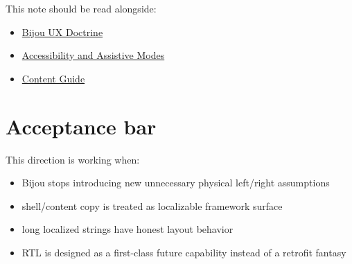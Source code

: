 This note should be read alongside:

\begin{itemize}
\tightlist
\item
  \href{https://github.com/flyingrobots/bijou/blob/cbd70612140e7a450d764b3c7be1c6af878b99bc/docs/strategy/bijou-ux-doctrine.md}{Bijou UX Doctrine}
\item
  \href{https://github.com/flyingrobots/bijou/blob/cbd70612140e7a450d764b3c7be1c6af878b99bc/docs/strategy/accessibility-and-assistive-modes.md}{Accessibility and Assistive Modes}
\item
  \href{https://github.com/flyingrobots/bijou/blob/cbd70612140e7a450d764b3c7be1c6af878b99bc/docs/strategy/content-guide.md}{Content Guide}
\end{itemize}

\section{Acceptance bar}\label{record-051-acceptance-bar}

This direction is working when:

\begin{itemize}
\tightlist
\item
  Bijou stops introducing new unnecessary physical left/right assumptions
\item
  shell/content copy is treated as localizable framework surface
\item
  long localized strings have honest layout behavior
\item
  RTL is designed as a first-class future capability instead of a retrofit fantasy
\end{itemize}

